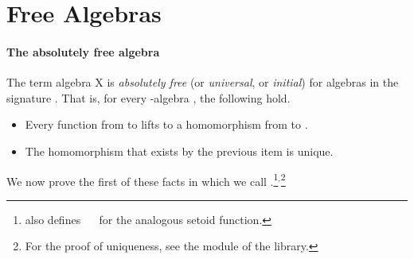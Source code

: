 
\section{Free Algebras}
\label{free-algebras}
\paragraph*{The absolutely free algebra}
The term algebra  \ab X is \emph{absolutely free} (or \emph{universal}, or
\emph{initial}) for algebras in the signature . That is, for every
-algebra , the following hold.

\begin{itemize}
\item Every function from  to  lifts to a homomorphism from   to .
\item The homomorphism that exists by the previous item is unique.
\end{itemize}

We now prove the first of these facts in \agda which we call .\footnote{\agdaalgebras also defines
  \as{:} ~~
 for the analogous setoid function.}$^,$\footnote{For the proof of uniqueness,
see the  module of the \agdaalgebras library.}

